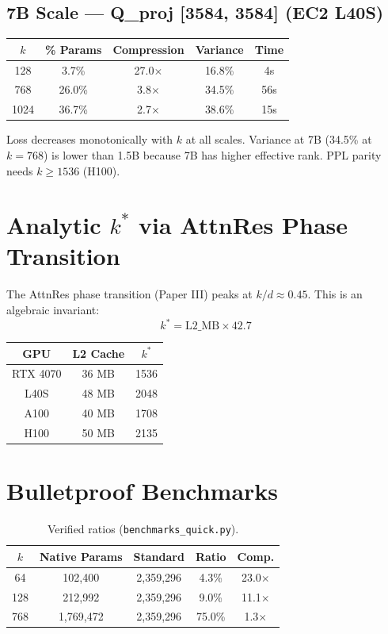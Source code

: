 \documentclass[11pt,a4paper]{article}
\begin{document}
\subsection{7B Scale --- Q\_proj [3584, 3584] (EC2 L40S)}
\begin{table}[h]\centering
\begin{tabular}{ccccc}\toprule
$k$ & \% Params & Compression & Variance & Time \\\midrule
128 & 3.7\% & 27.0$\times$ & 16.8\% & 4s \\
768 & 26.0\% & 3.8$\times$ & 34.5\% & 56s \\
1024 & 36.7\% & 2.7$\times$ & 38.6\% & 15s \\\bottomrule
\end{tabular}\end{table}

Loss decreases monotonically with $k$ at all scales. Variance at 7B (34.5\% at $k=768$) is lower than 1.5B because 7B has higher effective rank. PPL parity needs $k \ge 1536$ (H100).

\newpage

\section{Analytic $k^*$ via AttnRes Phase Transition}
The AttnRes phase transition (Paper III) peaks at $k/d \approx 0.45$. This is an algebraic invariant:
\begin{equation}
k^* = \mathrm{L2\_MB} \times 42.7
\end{equation}
\begin{table}[h]\centering
\begin{tabular}{ccc}\toprule
GPU & L2 Cache & $k^*$ \\\midrule
RTX 4070 & 36 MB & 1536 \\
L40S & 48 MB & 2048 \\
A100 & 40 MB & 1708 \\
H100 & 50 MB & 2135 \\\bottomrule
\end{tabular}\end{table}

\newpage

\section{Bulletproof Benchmarks}
\begin{table}[h]\centering
\begin{tabular}{ccccc}\toprule
$k$ & Native Params & Standard & Ratio & Comp. \\\midrule
64 & 102,400 & 2,359,296 & 4.3\% & 23.0$\times$ \\
128 & 212,992 & 2,359,296 & 9.0\% & 11.1$\times$ \\
768 & 1,769,472 & 2,359,296 & 75.0\% & 1.3$\times$ \\\bottomrule
\end{tabular}
\caption{Verified ratios (\texttt{benchmarks\_quick.py}).}
\end{table}
\end{document}
